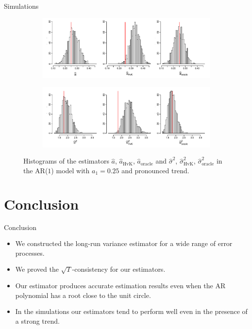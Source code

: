 \documentclass[10pt]{beamer}
\begin{document}
\begin{frame}{Simulations}


\begin{figure}[t!]
\centering
\begin{subfigure}[b]{0.8\textwidth}
\includegraphics[width=\textwidth]{a_hat_histograms_a1=25_T=500_slope=10_(q,r,M1,M2)=(25,10,20,30).pdf}
\end{subfigure}
\begin{subfigure}[b]{0.8\textwidth}
\includegraphics[width=\textwidth]{lrv_histograms_a1=25_T=500_slope=10_(q,r,M1,M2)=(25,10,20,30).pdf}
\end{subfigure}
\caption{Histograms of the estimators $\widehat{a}$, $\widehat{a}_{\text{HvK}}$, $\widehat{a}_{\text{oracle}}$ and $\widehat{\sigma}^2$, $\widehat{\sigma}^2_{\text{HvK}}$, $\widehat{\sigma}^2_{\text{oracle}}$ in the AR($1$) model with $a_1 = 0.25$ and pronounced trend.}\label{fig:hist_scenario2} 
\end{figure}

\end{frame}


\section{Conclusion}
\begin{frame}{Conclusion}
\begin{itemize}
\item We constructed the long-run variance estimator for a wide range of error processes.
\item We proved the $\sqrt{T}$-consistency for our estimators.
\item Our estimator produces accurate estimation results even when the AR polynomial has a root close to the unit circle.
\item In the simulations our estimators tend to perform well even in the presence of a strong trend.
\end{itemize}
\end{frame}
\end{document}
